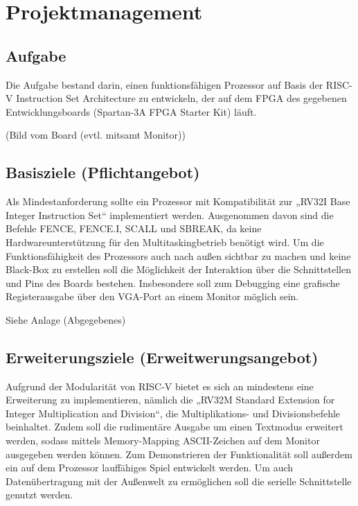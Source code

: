 


\chapter{Projektmanagement}

\section{Aufgabe}

Die Aufgabe bestand darin, einen funktionsfähigen Prozessor auf Basis der RISC-V Instruction Set Architecture zu entwickeln, der auf dem FPGA des gegebenen Entwicklungsboards (Spartan-3A FPGA Starter Kit) läuft. 

(Bild vom Board (evtl. mitsamt Monitor))


\section{Basisziele (Pflichtangebot)}
Als Mindestanforderung sollte ein Prozessor mit Kompatibilität zur „RV32I Base Integer Instruction Set“ implementiert werden. Ausgenommen davon sind die Befehle FENCE, FENCE.I, SCALL und SBREAK, da keine Hardwareunterstützung für den Multitaskingbetrieb benötigt wird.
Um die Funktionsfähigkeit des Prozessors auch nach außen sichtbar zu machen und keine Black-Box zu erstellen soll die Möglichkeit der Interaktion über die Schnittstellen und Pins des Boards bestehen. Insbesondere soll zum Debugging eine grafische Registerausgabe über den VGA-Port an einem Monitor möglich sein.

Siehe Anlage (Abgegebenes)


\section{Erweiterungsziele (Erweitwerungsangebot)}
Aufgrund der Modularität von RISC-V bietet es sich an mindestens eine Erweiterung zu implementieren, nämlich die „RV32M Standard Extension for Integer Multiplication and Division“, die Multiplikations- und Divisionsbefehle beinhaltet. Zudem soll die rudimentäre Ausgabe um einen Textmodus erweitert werden, sodass mittels Memory-Mapping ASCII-Zeichen auf dem Monitor ausgegeben werden können. Zum Demonstrieren der Funktionalität soll außerdem ein auf dem Prozessor lauffähiges Spiel entwickelt werden. Um auch Datenübertragung mit der Außenwelt zu ermöglichen soll die serielle Schnittstelle genutzt werden.

